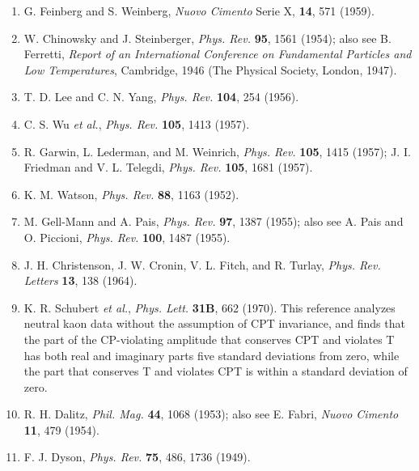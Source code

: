 \begin{enumerate}
\item[10.] \label{ref:3.10}G. Feinberg and S. Weinberg, \emph{Nuovo Cimento} Serie X,
  \textbf{14}, 571 (1959).

\item[11.] \label{ref:3.11}W. Chinowsky and J. Steinberger, \emph{Phys. Rev.} \textbf{95},
  1561 (1954); also see B. Ferretti, \emph{Report of an International
  Conference on Fundamental Particles and Low Temperatures}, Cambridge, 1946
  (The Physical Society, London, 1947).

\item[12.] \label{ref:3.12}T. D. Lee and C. N. Yang, \emph{Phys. Rev.} \textbf{104}, 254
  (1956).

\item[13.] \label{ref:3.13}C. S. Wu \emph{et al.}, \emph{Phys. Rev.} \textbf{105}, 1413
  (1957).

\item[14.] \label{ref:3.14}R. Garwin, L. Lederman, and M. Weinrich, \emph{Phys. Rev.}
  \textbf{105}, 1415 (1957); J. I. Friedman and V. L. Telegdi,
  \emph{Phys. Rev.} \textbf{105}, 1681 (1957).

\item[15.] \label{ref:3.15}K. M. Watson, \emph{Phys. Rev.} \textbf{88}, 1163 (1952).

\item[16.] \label{ref:3.16}M. Gell-Mann and A. Pais, \emph{Phys. Rev.} \textbf{97}, 1387
  (1955); also see A. Pais and O. Piccioni, \emph{Phys. Rev.} \textbf{100},
  1487 (1955).

\item[17.] \label{ref:3.17}J. H. Christenson, J. W. Cronin, V. L. Fitch, and R. Turlay,
  \emph{Phys. Rev. Letters} \textbf{13}, 138 (1964).

\item[18.] \label{ref:3.18}K. R. Schubert \emph{et al.}, \emph{Phys. Lett.} \textbf{31B},
  662 (1970). This reference analyzes neutral kaon data without the assumption
  of CPT invariance, and finds that the part of the CP-violating amplitude
  that conserves CPT and violates T has both real and imaginary parts five
  standard deviations from zero, while the part that conserves T and violates
  CPT is within a standard deviation of zero.

\item[19.] \label{ref:3.19}R. H. Dalitz, \emph{Phil. Mag.} \textbf{44}, 1068 (1953); also see
  E. Fabri, \emph{Nuovo Cimento} \textbf{11}, 479 (1954).

\item[20.] \label{ref:3.20}F. J. Dyson, \emph{Phys. Rev.} \textbf{75}, 486, 1736 (1949).


\end{enumerate}
